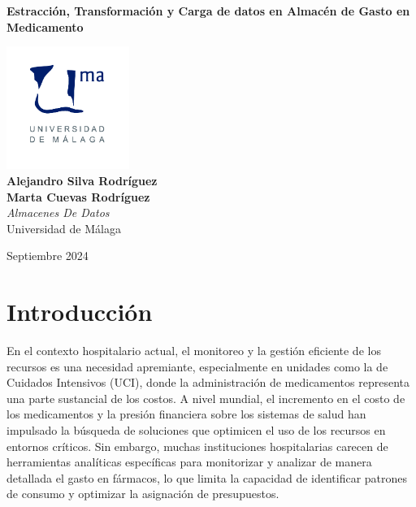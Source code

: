 \documentclass{article}
\begin{document}
	
	
	
	\begin{titlepage}
		\centering
		\vspace*{3cm}
		
		{\Huge \textbf{Estracción, Transformación y Carga de datos en Almacén de Gasto en Medicamento}\\[0.5cm]}
		
		\vspace{2cm}
		\includegraphics[width=0.3\textwidth]{images/uma_logo.jpg}\\[1cm]
		
		{\LARGE \textbf{Alejandro Silva Rodríguez}\\[0.5cm]}
		{\LARGE \textbf{Marta Cuevas Rodríguez}\\[0.5cm]}
		{\large \textit{Almacenes De Datos}\\
			Universidad de Málaga\\
		}
		
		\vfill
		
		{\large Septiembre 2024}
	\end{titlepage}
	
	\tableofcontents
	
	\newpage
	\section{Introducción}
	\label{sec:introduccion}
	
	En el contexto hospitalario actual, el monitoreo y la gestión eficiente de los recursos es una necesidad apremiante, especialmente en unidades como la de Cuidados Intensivos (UCI), donde la administración de medicamentos representa una parte sustancial de los costos. A nivel mundial, el incremento en el costo de los medicamentos y la presión financiera sobre los sistemas de salud han impulsado la búsqueda de soluciones que optimicen el uso de los recursos en entornos críticos. Sin embargo, muchas instituciones hospitalarias carecen de herramientas analíticas específicas para monitorizar y analizar de manera detallada el gasto en fármacos, lo que limita la capacidad de identificar patrones de consumo y optimizar la asignación de presupuestos.\\
	
\end{document}
